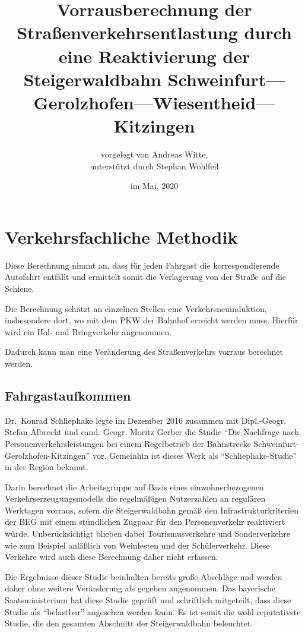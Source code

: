 \documentclass[fontsize=12pt,a4paper]{scrreprt}
\begin{document}
\title{Vorrausberechnung der Straßenverkehrsentlastung
        durch eine Reaktivierung der Steigerwaldbahn
        Schweinfurt---Gerolzhofen---Wiesentheid---Kitzingen}
\date{im Mai, 2020}
\author{vorgelegt von Andreas Witte,\\ unterstützt durch Stephan Wohlfeil}
\maketitle

\renewcommand{\contentsname}{Inhaltsverzeichnis}
\tableofcontents

\chapter{Verkehrsfachliche Methodik}

Diese Berechnung nimmt an, dass für jeden Fahrgast die korrespondierende Autofahrt entfällt und ermittelt somit die Verlagerung von der Straße auf die Schiene.

Die Berechnung schätzt an einzelnen Stellen eine Verkehrsneuinduktion, insbesondere dort, wo mit dem PKW der Bahnhof erreicht werden muss. Hierfür wird ein Hol- und Bringverkehr angenommen.

Dadurch kann man eine Veränderung des Straßenverkehrs vorraus berechnet werden.

\section{Fahrgastaufkommen}

Dr.\ Konrad Schliephake legte im Dezember 2016 zusammen mit Dipl.-Geogr. Stefan Albrecht und cand. Geogr. Moritz Gerber die Studie \enquote{Die Nachfrage nach Personenverkehrsleistungen bei einem Regelbetrieb der Bahnstrecke Schweinfurt-Gerolzhofen-Kitzingen} vor. Gemeinhin ist dieses Werk als \enquote{Schliephake-Studie} in der Region bekannt.

Darin berechnet die Arbeitsgruppe auf Basis eines einwohnerbezogenen Verkehrserzeugungsmodells die regelmäßigen Nutzerzahlen an regulären Werktagen vorraus, sofern die Steigerwaldbahn gemäß den Infrastrukturkriterien der BEG mit einem stündlichen Zugpaar für den Personenverkehr reaktiviert würde. Unberücksichtigt blieben dabei Tourismusverkehre und Sonderverkehre wie zum Beispiel anläßlich von Weinfesten und der Schülerverkehr. Diese Verkehre wird auch diese Berechnung daher nicht erfassen.

Die Ergebnisse dieser Studie beinhalten bereits große Abschläge und werden daher ohne weitere Veränderung als gegeben angenommen. Das bayerische Saatsministerium hat diese Studie geprüft und schriftlich mitgeteilt, dass diese Studie als \enquote{belastbar} angesehen werden kann. Es ist somit die wohl reputativste Studie, die den gesamten Abschnitt der Steigerwaldbahn beleuchtet.
\end{document}
